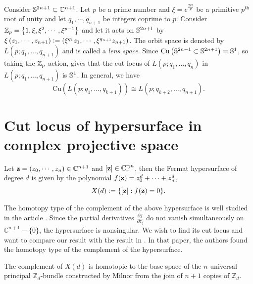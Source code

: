 \begin{eg}
	Consider $\mathbb{S}^{2n+1}\subset \mathbb{C}^{n+1}$. Let $p$ be a prime number and $\xi=e^{\frac{2\iota\pi}{p}}$ be a primitive $p^{\text{th}}$ root of unity and let $q_1,\cdots,q_{n+1}$ be integers coprime to $p$. Consider $\mathbb{Z}_p=\left\{1,\xi,\xi^2,\cdots, \xi^{p-1}\right\}$ and let it acts on $\mathbb{S}^{2n+1}$ by $\xi \left(z_1,\cdots,z_{n+1}\right)\vcentcolon= \left(\xi^{q_1}z_1,\cdots,\xi^{q_{n+1}}z_{n+1}\right)$. The orbit space is denoted by $L(p;q_1,\ldots,q_{n+1})$ and is called a \emph{lens space}. Since $\mathrm{Cu} \left(\mathbb{S}^{2n-1}\subset \mathbb{S}^{2n+1}\right)=\mathbb{S}^1$, so taking the $\mathbb{Z}_p$ action, gives that the cut locus of $L\left(p;q_1,\ldots,q_n\right)$ in $L \left(p;q_1,\ldots,q_{n+1}\right)$ is $\mathbb{S}^1$. In general, we have
	\begin{displaymath}
		\mathrm{Cu}\left(L \left(p;q_1,\ldots,q_{k+1}\right)\right) \cong L \left(p;q_{k+2},\ldots,q_{n+1}\right).
	\end{displaymath}
\end{eg}


\section{Cut locus of hypersurface in complex projective space}\label{subsec:cut-locus-for-X(d)} 

\hfb Let $\mathbf{z}=\left(z_0,\cdots,z_{n}\right)\in \mathbb{C}^{n+1}$ and $[\mathbf{z}]\in \mathbb{CP}^{n}$, then the Fermat hypersurface of degree $d$ is given by the polynomial $f(\mathbf{z}) = z_0^d+\cdots+z_{n}^d$, 
\begin{displaymath}
	X(d) \vcentcolon= \{[\mathbf{z}]:f(\mathbf{z})=0\}.
\end{displaymath} 

\noindent The homotopy type of the complement of the above hypersurface is well studied in the article \cite{KuWo80}. Since the partial derivatives $\frac{\partial f}{\partial z_j}$ do not vanish simultaneously on $\mathbb{C}^{n+1}-\{0\}$, the hypersurface is nonsingular. We wish to find its cut locus and want to compare our result with the result in \cite[Proposition 3.1]{KuWo80}. In that paper, the authors found the homotopy type of the complement of the hypersurface.
\begin{prop}
	The complement of $X(d)$ is homotopic to the base space of the $n$ universal principal $\mathbb{Z}_d$-bundle constructed by Milnor from the join of $n+1$ copies of $\mathbb{Z}_d$.  
\end{prop}

